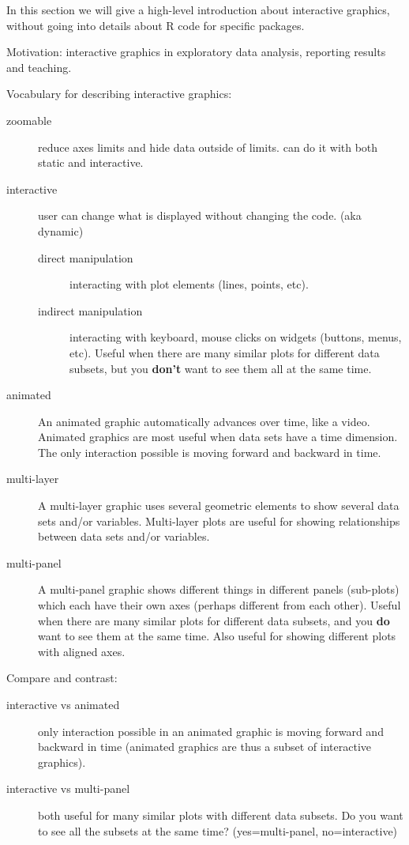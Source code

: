 \documentclass[11pt]{article}
\begin{document}
In this section we will give a high-level introduction about
interactive graphics, without going into details about R code for
specific packages.

Motivation: interactive graphics in exploratory data analysis,
reporting results and teaching.

Vocabulary for describing interactive graphics:
\begin{description}
\item[zoomable] reduce axes limits and hide data outside of limits. can
  do it with both static and interactive.
\item[{interactive}] user can change what is displayed without
  changing the code. (aka dynamic)
  \begin{description}
  \item[{direct manipulation}] interacting with plot elements (lines,
    points, etc).
  \item[{indirect manipulation}] interacting with keyboard, mouse clicks
    on widgets (buttons, menus, etc).
    Useful when there are many similar plots for
different data subsets,
    but you \textbf{don't} want to see them all at the same time.
\end{description}
\item[{animated}] An animated graphic automatically advances over time,
like a video. Animated graphics are most useful when data sets
have a time dimension. The only interaction possible is moving
forward and backward in time.
\item[{multi-layer}] A multi-layer graphic uses several geometric elements
to show several data sets and/or variables. Multi-layer plots are
useful for showing relationships between data sets and/or
variables.
\item[{multi-panel}] A multi-panel graphic shows different things in
different panels (sub-plots) which each have their own axes
(perhaps different from each other). Useful when there are many
similar plots for different data subsets, and you \textbf{do} want to
see them at the same time. Also useful for showing different
plots with aligned axes.
\end{description}
Compare and contrast:
\begin{description}
\item[{interactive vs animated}] only interaction possible in an animated
graphic is moving forward and backward in time (animated graphics
are thus a subset of interactive graphics).
\item[{interactive vs multi-panel}] both useful for many similar plots
with different data subsets. Do you want to see all the subsets
at the same time? (yes=multi-panel, no=interactive)
\end{description}
\end{document}
